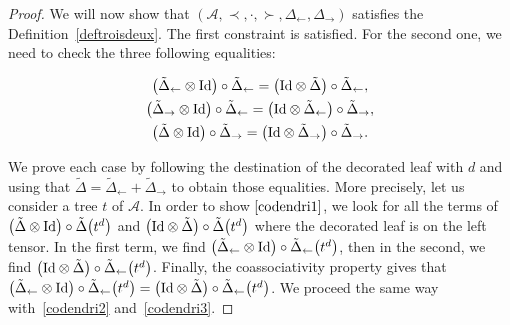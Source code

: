 \documentclass[pdftex]{sigma}
\numberwithin{equation}{section}
\theoremstyle{definition}
\theoremstyle{plain}
\begin{document}
\begin{proof}
	We will now show that $(\mathcal{A},\prec,\cdot,\succ,\Delta_{\leftarrow},\Delta_{\rightarrow})$ satisfies the Definition~\ref{deftroisdeux}.
	The first constraint is satisfied.
	For the second one, we need to check the three following equalities:{\samepage
	\begin{gather}
		\big(\tilde{\Delta}_{\leftarrow}\otimes {\rm Id}\big)\circ \tilde{\Delta}_{\leftarrow}=\big({\rm Id}\otimes \tilde{\Delta}\big)\circ \tilde{\Delta}_{\leftarrow}, \label{codendri1} \\
		\big(\tilde{\Delta}_{\rightarrow}\otimes {\rm Id}\big)\circ \tilde{\Delta}_{\leftarrow}=\big({\rm Id} \otimes \tilde{\Delta}_{\leftarrow}\big)\circ \tilde{\Delta}_{\rightarrow}, \label{codendri2} \\
		\big(\tilde{\Delta}\otimes {\rm Id}\big)\circ \tilde{\Delta}_{\rightarrow}=\big({\rm Id}\otimes \tilde{\Delta}_{\rightarrow}\big)\circ \tilde{\Delta}_{\rightarrow}. \label{codendri3}
	\end{gather}

}\pagebreak

\noindent
	We prove each case by following the destination of the decorated leaf with $d$ and using that $\tilde{\Delta}=\tilde{\Delta}_{\leftarrow}+\tilde{\Delta}_{\rightarrow}$ to obtain those equalities.
	More precisely, let us consider a tree $t$ of $\mathcal{A}$. In order to show $\eqref{codendri1}$, we look for all the terms of $\big(\tilde{\Delta}\otimes {\rm Id}\big)\circ \tilde{\Delta}\big(t^d\big)$ and $\big({\rm Id}\otimes \tilde{\Delta}\big)\circ \tilde{\Delta}\big(t^d\big)$
	where the decorated leaf is on the left tensor. In the first term, we find $\big(\tilde{\Delta}_{\leftarrow}\otimes {\rm Id}\big)\circ \tilde{\Delta}_{\leftarrow}\big(t^d\big)$, then in the second, we find $\big({\rm Id}\otimes \tilde{\Delta}\big)\circ \tilde{\Delta}_{\leftarrow}\big(t^d\big)$.
	Finally, the coassociativity property gives that $\big(\tilde{\Delta}_{\leftarrow}\otimes {\rm Id}\big)\circ \tilde{\Delta}_{\leftarrow}\big(t^d\big)=\big({\rm Id}\otimes \tilde{\Delta}\big)\circ \tilde{\Delta}_{\leftarrow}\big(t^d\big)$.
	We proceed the same way with~\eqref{codendri2} and~\eqref{codendri3}.
	

\end{proof}
\end{document}
